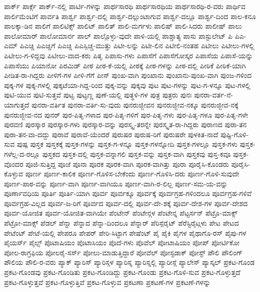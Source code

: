 {ಪಾರ್ಕ್
ಪಾರ್ಕ್ಗೆ
ಪಾರ್ಕ್-ನಲ್ಲಿ
ಪಾರ್ಟಿ-ಗಳನ್ನು
ಪಾರ್ಥಸಾರಥಿ
ಪಾರ್ಥಸಾರಥಿಯ
ಪಾರ್ಥಸಾರಥಿ-ರ-ವರು
ಪಾರ್ಥಿವ
ಪಾರ್ಲಿಮೆಂಟಿಗೆ
ಪಾರ್ವತಿ
ಪಾರ್ಶ್ವ
ಪಾರ್ಶ್ವ-ದಲ್ಲಿ
ಪಾರ್ಶ್ವ-ದಲ್ಲುಂಟಾಗುವ
ಪಾರ್ಶ್ವ-ದಲ್ಲೂ
ಪಾರ್ಶ್ವ-ದಿಂದ
ಪಾಲ-ಕನೂ
ಪಾಲಕ್ಕಾ-ಡಿನ
ಪಾಲಿಗೆ
ಪಾಲಿಟಿಕ್ಸ್
ಪಾಲಿಟ್
ಪಾಲಿತ್
ಪಾಲಿ-ಮರ್ಗಳು
ಪಾಲಿಷ್
ಪಾಲಿ-ಸಿದರು
ಪಾಲೀಷ್
ಪಾಲು
ಪಾಲೋಮಾರ್
ಪಾಲೋಮಾರ್ನ
ಪಾಲ್
ಪಾಲ್ಗೊಳ್ಳು-ವುದೇ
ಪಾಳಿ-ಯಲ್ಲಿ
ಪಾಶ್ಚಾತ್ಯ
ಪಾಸು
ಪಾಸ್ಟುಲೇಟ್
ಪಿ
ಪಿಎ-ಎಮ್
ಪಿಎಚ್ಡಿ
ಪಿಎಚ್ಡಿಗೆ
ಪಿಎಚ್ಡಿ
ಪಿಎಸ್ಪಿಚ್ಚ-ಮುತ್ತು
ಪಿಟೀ-ಲನ್ನು
ಪಿಟೀ-ಲಿನ
ಪಿಟೀಲಿ-ನಂತಹ
ಪಿಟೀಲು
ಪಿಟೀಲು-ಗಳಲ್ಲಿ
ಪಿಟೀಲು-ಗ-ಳಿದ್ದವು
ಪಿಟೀಲು-ವಾದ-ಕರು
ಪಿತೃ
ಪಿಪಾಸು-ಗಳು
ಪಿಪಾಸೆಗೆ
ಪಿಪಾಸೆಗೋಸ್ಕರ
ಪಿಪಾಸೆಯ
ಪಿಪಾಸೆ-ಯನ್ನು
ಪಿಪಾಸೆಯು
ಪಿಯಾನೋ
ಪಿರಮಿಡ್
ಪೀಠ
ಪೀಠ-ಕೆ-ಯಲ್ಲಿ
ಪೀಠಕ್ಕೆ
ಪೀಠ-ಗಳನ್ನು
ಪೀಠ-ದಲ್ಲಿ
ಪೀಠಿಕೆ
ಪೀಠಿಕೆ-ಯಾಗಿ
ಪೀಡಿತ-ರಾ-ಗಿದ್ದರು
ಪೀಳಿಗೆ-ಗಳ
ಪೀಳಿ-ಗೆಗೆ
ಪೀಸ್
ಪುಂಖ-ವಾಗಿ
ಪುಂಖಾನು
ಪುಂಖಾನು-ಪುಂಖ-ವಾಗಿ
ಪುಂಜ-ಗಳಿಂದ
ಪುಕ್ಕ-ಗಳ
ಪುಕ್ಕ-ಗಳಲ್ಲಿ
ಪುಕ್ಕಟೆಯಾ-ಗಿದ್ದ-ರಿಂದ
ಪುಕ್ಕ-ವನ್ನು
ಪುಕ್ಕವು
ಪುಟ
ಪುಟ-ಗಳನ್ನು
ಪುಟ-ಗ-ಳನ್ನೂ
ಪುಟ-ಗಳಲ್ಲಿ
ಪುಟಿ-ಯುವ
ಪುಟಿ-ಸುತ್ತವೆ
ಪುಟ್ಟ
ಪುಟ್ಟಣ್ಣ
ಪುಣೆ-ಯಲ್ಲಿ
ಪುತ್ಥಳಿ-ಗಳ
ಪುತ್ರ
ಪುತ್ರರು
ಪುನಃ
ಪುನರಾ-ವರ್ತ-ನೆ-ಯಾಗುತ್ತದೆ
ಪುನರಾ-ವರ್ತಿತ
ಪುನರಾ-ವರ್ತಿ-ಸು-ವುದು
ಪುನರುಜ್ಜೀವನ
ಪುನರುಜ್ಜೀವ-ನಕ್ಕೂ
ಪುನರುಜ್ಜೀವ-ನಕ್ಕೆ
ಪುನರುಜ್ಜೀವ-ನದ
ಪುನರ್
ಪುರ-ಪಿತೃ-ಗಳಾದ
ಪುರ-ಪಿತೃ-ಗಳಿಗೆ
ಪುರ-ಪಿತೃ-ಗಳು
ಪುರ-ಪಿತೃ-ಗಳೂ
ಪುರ-ಪಿತೃ-ಗಳೇ
ಪುರವಣಿ
ಪುರಸ್ಕಾರ
ಪುರಸ್ಕಾರ-ಗಳು
ಪುರಸ್ಕಾರ-ವನ್ನು
ಪುರಸ್ಕೃ-ತರನ್ನೇ
ಪುರಸ್ಕೃತ-ರಾ-ಗಿದ್ದರು
ಪುರಾಣದ
ಪುರಾ-ತನ
ಪುರಾ-ತನ-ವಾ-ದದ್ದು
ಪುರಾವೆ
ಪುರಾವೆ-ಯೆಂದರೆ
ಪುರುಷರ
ಪುರುಷ-ರಿಗೆ
ಪುರುಷರೇ
ಪುಳಕಿತ-ನಾದೆ
ಪುಷ್ಟಿ-ಗೊಳಿ-ಸುವ
ಪುಷ್ಪ
ಪುಸ್ತಕ
ಪುಸ್ತಕಕ್ಕೆ
ಪುಸ್ತಕ-ಗಳನ್ನು
ಪುಸ್ತಕ-ಗ-ಳನ್ನೂ
ಪುಸ್ತಕ-ಗಳನ್ನೋದಿ
ಪುಸ್ತಕ-ಗಳಲ್ಲೂ
ಪುಸ್ತಕ-ಗಳು
ಪುಸ್ತಕ-ಗಳೆಲ್ಲ-ದ-ರಲ್ಲೂ
ಪುಸ್ತಕದ
ಪುಸ್ತಕ-ದಲ್ಲಿ
ಪುಸ್ತಕ-ವನ್ನಾಗಲಿ
ಪುಸ್ತಕ-ವನ್ನು
ಪುಸ್ತಕ-ವಾಗಿ
ಪುಸ್ತಕವು
ಪುಸ್ತ-ಕವೂ
ಪುಸ್ತಕ-ವೊಂದರ
ಪೂಜಿ-ಸುತ್ತಿದ್ದ
ಪೂಜೆ
ಪೂನಾ
ಪೂರಕ
ಪೂರಕ-ವಾಗಿ
ಪೂರಕ-ವಾಗಿತ್ತು
ಪೂರಾ
ಪೂರೈಸಿ-ಕೊಂಡರು
ಪೂರೈಸಿ-ಕೊಳ್ಳುವ
ಪೂರ್ಣ
ಪೂರ್ಣ-ಕಾಲಿಕ
ಪೂರ್ಣ-ಗೊಳಿಸ-ಬೇಕೆಂದು
ಪೂರ್ಣ-ಗೊಳಿಸಿ-ದರು
ಪೂರ್ಣ-ಗೊಳಿ-ಸುವುದೇ
ಪೂರ್ಣ-ಪಾಠ-ವನ್ನು
ಪೂರ್ಣ-ವಾಗಿ
ಪೂರ್ಣ-ವಾಗಿಯೂ
ಪೂರ್ಣ-ವಾಗಿ-ರ-ಲಿಲ್ಲ
ಪೂರ್ಣ-ಸಮ-ಯ-ವನ್ನು
ಪೂರ್ಣಾವಧಿಯ
ಪೂರ್ತಿ
ಪೂರ್ತಿ-ಯಾಗಿ
ಪೂರ್ವ
ಪೂರ್ವಕ್ಕೂ
ಪೂರ್ವಕ್ಕೆ
ಪೂರ್ವಗ್ರಹ-ಗಳಿಂದಲೂ
ಪೂರ್ವಗ್ರಹ-ಗಳಿವೆ
ಪೂರ್ವಗ್ರಹ-ವಿಲ್ಲದ
ಪೂರ್ವ-ಜ-ರಿಗೆ
ಪೂರ್ವದ
ಪೂರ್ವ-ದಲ್ಲಿ
ಪೂರ್ವ-ದೇ-ಶಕ್ಕೆ
ಪೂರ್ವ-ದೇಶ-ಗಳ
ಪೂರ್ವ-ದೇಶದ
ಪೂರ್ವ-ಯೋಜಿತ
ಪೂರ್ವ-ಯೋಜಿತ-ವಾಗಿಯೇ
ಪೆಂಟೇನ್
ಪೆಂಟೇನ್ಗಳ
ಪೆಂಟೇನ್ನ
ಪೆಟ್ಟರ್ಸನ್
ಪೆಟ್ರೊ-ಮಾಕ್ಸ್
ಪೆಟ್ರೋ-ಮಾಕ್ಸ್
ಪೆಡಲ್
ಪೆನ್ನಾ
ಪೆನ್ನಾದ
ಪೆನ್ನಾ-ದಿಂದಲೂ
ಪೆನ್ನಾರ್
ಪೆರಿಸ್ಪೆರೈಟ್
ಪೆರೆಸ್ಟಿರೈಟ್ಗಳು
ಪೇಟ
ಪೇಟದ
ಪೇಟೆಂಟ್
ಪೇಟೆ-ಯಲ್ಲಿ
ಪೇಪರೂ
ಪೇಪರ್
ಪೇರಿ-ಸಿಟ್ಟಾಗ
ಪೇಷೆಂಟ್
ಪೈ
ಪೈಕಿ
ಪೈಗಳ
ಪೈಥಾಗೊ-ರಸ್
ಪೈಪು-ಗಳ
ಪೈಯರ್ಸ್
ಪೈಲ್ಸ್
ಪೊಟಾಷಿಯಂ
ಪೊಟಾಸಿಯಂ
ಪೊದೆ-ಗಳು
ಪೊವೆಲ್
ಪೋಟಾಷಿಯಂ
ಪೋಪ್
ಪೋರ್ಟಿಕೋ
ಪೋಲ-ರಾಗ್ರಫಿಯ
ಪೋಲರೈ-ಸರ್ಸ್
ಪೋಲು-ಮಾಡುತ್ತಿದ್ದಾರೆ
ಪೋವೆಲ್
ಪೋಸ್ಟಡಾಕ್
ಪೋಸ್ಟ್
ಪೌಲಿ
ಪೌಲಿಂಗ್
ಪೌಲಿಯ
ಪೌಲಿ-ರ-ವರು
ಪ್ಯಾಕ್
ಪ್ಯಾರಿಸ್
ಪ್ಯಾರಿಸ್ಗಳ
ಪ್ಯಾರಿಸ್ನ
ಪ್ಯಾರಿಸ್ನಲ್ಲಿ
ಪ್ಯಾರೀಸ್ಗೆ
ಪ್ಯಾಲೇಸ್
ಪ್ಯಾಸ್ಕಲ್
ಪ್ರಕಟ-ಗೊಂಡ
ಪ್ರಕಟ-ಗೊಂಡವು
ಪ್ರಕಟ-ಗೊಂಡಿತು
ಪ್ರಕಟ-ಗೊಂಡಿದ್ದು
ಪ್ರಕಟ-ಗೊಂಡು
ಪ್ರಕಟ-ಗೊಳಿ-ಸುವ
ಪ್ರಕಟ-ಗೊಳ್ಳುತ್ತದೆ
ಪ್ರಕಟ-ಗೊಳ್ಳುತ್ತವೆ
ಪ್ರಕಟ-ಗೊಳ್ಳುತ್ತಿವೆ
ಪ್ರಕಟ-ಗೊಳ್ಳುವ
ಪ್ರಕಟಣಾ
ಪ್ರಕಟಣೆ-ಗಳ
ಪ್ರಕಟಣೆ-ಗಳನ್ನು
}
